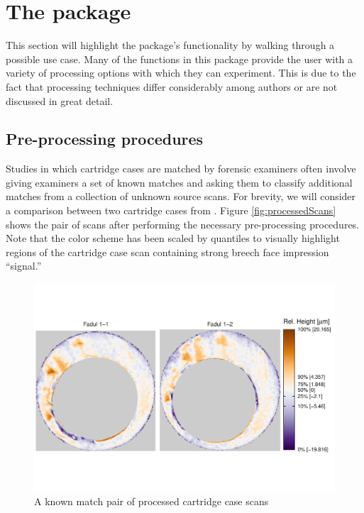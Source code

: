 \hypertarget{the-package}{%
\section{\texorpdfstring{The 
package}{The  package}}\label{the-package}}

This section will highlight the  package's functionality by
walking through a possible use case. Many of the functions in this
package provide the user with a variety of processing options with which
they can experiment. This is due to the fact that processing techniques
differ considerably among authors or are not discussed in great detail.

\hypertarget{preProcessing}{%
\subsection{Pre-processing procedures}\label{preProcessing}}

Studies in which cartridge cases are matched by forensic examiners often
involve giving examiners a set of known matches and asking them to
classify additional matches from a collection of unknown source scans.
For brevity, we will consider a comparison between two cartridge cases
from \citep{fadul_empirical_nodate}. Figure \ref{fig:processedScans}
shows the pair of scans after performing the necessary pre-processing
procedures. Note that the color scheme has been scaled by quantiles to
visually highlight regions of the cartridge case scan containing strong
breech face impression ``signal.''

\begin{Schunk}
\begin{figure}[htbp]

{\centering \includegraphics[width=1.2\textwidth,trim={0 2.5cm 0 2cm}]{cmcR_files/figure-latex/unnamed-chunk-6-1} 

}

\caption{\label{fig:processedScans} A known match pair of processed cartridge case scans}\label{fig:unnamed-chunk-6}
\end{figure}
\end{Schunk}

